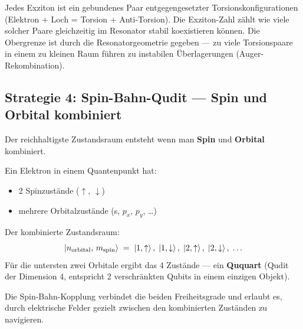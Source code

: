 \begin{foundation}
Jedes Exziton ist ein gebundenes Paar entgegengesetzter
Torsionskonfigurationen (Elektron + Loch = Torsion + Anti-Torsion).
Die Exziton-Zahl zählt wie viele solcher Paare
gleichzeitig im Resonator stabil koexistieren können.
Die Obergrenze ist durch die Resonatorgeometrie gegeben ---
zu viele Torsionspaare in einem zu kleinen Raum
führen zu instabilen Überlagerungen (Auger-Rekombination).
\end{foundation}

\subsection{Strategie 4: Spin-Bahn-Qudit --- Spin und Orbital kombiniert}
\label{sec:spin-orbital}

Der reichhaltigste Zustandsraum entsteht wenn man
\textbf{Spin} und \textbf{Orbital} kombiniert.

Ein Elektron in einem Quantenpunkt hat:
\begin{itemize}
  \item 2 Spinzustände ($\uparrow$, $\downarrow$)
  \item mehrere Orbitalzustände (s, $p_x$, $p_y$, \ldots)
\end{itemize}
Der kombinierte Zustandsraum:
\begin{equation}
  \left|n_\text{orbital},\, m_\text{spin}\right\rangle
  \;=\; \left|1,\uparrow\right\rangle,\;\left|1,\downarrow\right\rangle,\;
  \left|2,\uparrow\right\rangle,\;\left|2,\downarrow\right\rangle,\;\ldots
\end{equation}
Für die untersten zwei Orbitale ergibt das 4 Zustände ---
ein \textbf{Ququart} (Qudit der Dimension 4,
entspricht 2 verschränkten Qubits in einem einzigen Objekt).

Die Spin-Bahn-Kopplung verbindet die beiden Freiheitsgrade
und erlaubt es, durch elektrische Felder gezielt
zwischen den kombinierten Zuständen zu navigieren.

\begin{center}
\end{center}

